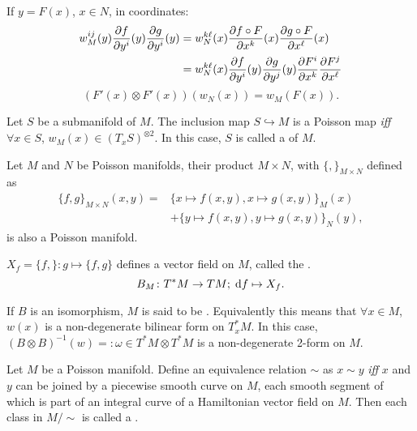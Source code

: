 \documentclass[openany, a5paper]{book}
\begin{document}
If $y = F(x)$, $x \in N$, in coordinates:
\begin{align*}
	w_M^{ij}(y) \pdiff{f}{y^i}(y) \pdiff{g}{y^i}(y)
	&= w_N^{k\ell}(x) \pdiff{f \circ F}{x^k}(x) \pdiff{g \circ F}{x^\ell}(x)
	\\
	&= w_N^{k\ell}(x) \pdiff{f}{y^i}(y) \pdiff{g}{y^j}(y) \pdiff{F^i}{x^k} \pdiff{F^j}{x^\ell}
\end{align*}
\hence
\begin{equation}
	(F'(x) \otimes F'(x)) (w_N(x)) = w_M(F(x)).
\end{equation}

\begin{definition}
	Let $S$ be a submanifold of $M$.
	The inclusion map $S \hookrightarrow M$ is a Poisson map \emph{iff} $\forall x \in S$,
	$w_M(x) \in (T_x S)^{\otimes 2}$. 
	In this case, $S$ is called a  of $M$.
\end{definition}

\begin{definition}
	Let $M$ and $N$ be Poisson manifolds, their product $M \times N$,
	with $\{, \}_{M \times N}$ defined as
	\begin{equation}
		\begin{aligned}
		\{f, g\}_{M \times N} (x, y) =& \{
			x \mapsto f(x, y),
			x \mapsto g(x, y)
			\}_M (x)
		\\
		&
		+ \{
			y \mapsto f(x, y),
			y \mapsto g(x, y)
		\}_N (y),
		\end{aligned}
	\end{equation}
	is also a Poisson manifold.
\end{definition}

$X_f = \{f, \} \colon g \mapsto \{f, g\}$ defines a vector field on $M$, called the .
\begin{equation}
	B_M \colon T^*M \to TM;\; 
	\mathrm{d} f \mapsto X_f.
\end{equation}

If $B$ is an isomorphism, $M$ is said to be .
Equivalently this means that $\forall x \in M$, $w(x)$ is a non-degenerate bilinear form on $T^*_x M$.
In this case, $(B \otimes B)^{-1} (w) =: \omega \in T^* M \otimes T^* M$ is a non-degenerate 2-form on $M$.

\begin{definition}\label{definition: symplectic leaves}
	Let $M$ be a Poisson manifold.
	Define an equivalence relation $\sim$ as $x \sim y$ \emph{iff} $x$ and $y$ can be joined by a piecewise smooth curve on $M$, each smooth segment of which is part of an integral curve of a Hamiltonian vector field on $M$.
	Then each class in $M / \sim$ is called a . 
\end{definition}
\end{document}

